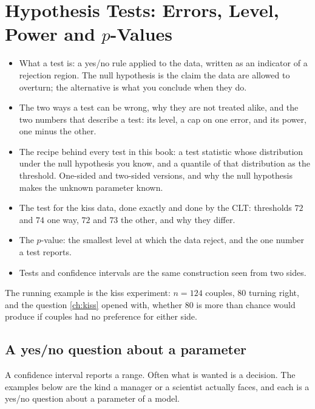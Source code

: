 \chapter[Hypothesis Tests]{Hypothesis Tests: Errors, Level, Power and $p$-Values}
\label{ch:tests-foundations}

\begin{chaptergoals}
\begin{itemize}[nosep]
\item What a test is: a yes/no rule applied to the data, written as an indicator of a rejection region. The null hypothesis is the claim the data are allowed to overturn; the alternative is what you conclude when they do.
\item The two ways a test can be wrong, why they are not treated alike, and the two numbers that describe a test: its level, a cap on one error, and its power, one minus the other.
\item The recipe behind every test in this book: a test statistic whose distribution under the null hypothesis you know, and a quantile of that distribution as the threshold. One-sided and two-sided versions, and why the null hypothesis makes the unknown parameter known.
\item The test for the kiss data, done exactly and done by the CLT: thresholds $72$ and $74$ one way, $72$ and $73$ the other, and why they differ.
\item The $p$-value: the smallest level at which the data reject, and the one number a test reports.
\item Tests and confidence intervals are the same construction seen from two sides.
\end{itemize}
The running example is the kiss experiment: $n = 124$ couples, $80$ turning right, and the question \cref{ch:kiss} opened with, whether $80$ is more than chance would produce if couples had no preference for either side.
\end{chaptergoals}

\section{A yes/no question about a parameter}
\label{sec:tests-question}

A confidence interval reports a range.
Often what is wanted is a decision.
The examples below are the kind a manager or a scientist actually faces, and each is a yes/no question about a parameter of a model.

